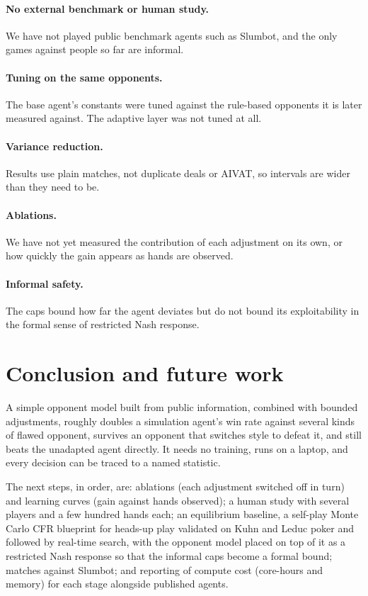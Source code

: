 \paragraph{No external benchmark or human study.} We have not played public benchmark agents
such as Slumbot, and the only games against people so far are informal.

\paragraph{Tuning on the same opponents.} The base agent's constants were tuned against the
rule-based opponents it is later measured against. The adaptive layer was not tuned at all.

\paragraph{Variance reduction.} Results use plain matches, not duplicate deals or AIVAT, so
intervals are wider than they need to be.

\paragraph{Ablations.} We have not yet measured the contribution of each adjustment on its
own, or how quickly the gain appears as hands are observed.

\paragraph{Informal safety.} The caps bound how far the agent deviates but do not bound its
exploitability in the formal sense of restricted Nash response.

\section{Conclusion and future work}
\label{sec:conclusion}

A simple opponent model built from public information, combined with bounded adjustments,
roughly doubles a simulation agent's win rate against several kinds of flawed opponent,
survives an opponent that switches style to defeat it, and still beats the unadapted agent
directly. It needs no training, runs on a laptop, and every decision can be traced to a named
statistic.

The next steps, in order, are: ablations (each adjustment switched off in turn) and learning
curves (gain against hands observed); a human study with several players and a few hundred
hands each; an equilibrium baseline, a self-play Monte Carlo CFR blueprint for heads-up play
validated on Kuhn and Leduc poker and followed by real-time search, with the opponent model
placed on top of it as a restricted Nash response so that the informal caps become a formal
bound; matches against Slumbot; and reporting of compute cost (core-hours and memory) for
each stage alongside published agents.

